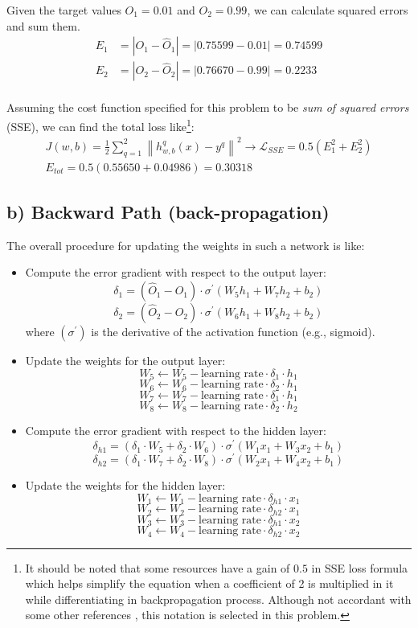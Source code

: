 \documentclass[conference]{IEEEtran}
\begin{document}
Given the target values \(
O_1 = 0.01
\) and \(
O_2 = 0.99
\), we can calculate squared errors and sum them.
\begin{align*}
    E_1 & = |O_1 - \hat{O}_1| = |0.75599 - 0.01| = 0.74599 \nonumber \\
    E_2 & = |O_2 - \hat{O}_2| = |0.76670 - 0.99| = 0.2233 \nonumber  \\
\end{align*}

Assuming the cost function specified for this problem to be \textit{sum of squared errors} (SSE), we can find the total loss like\footnote{It should be noted that some resources \cite{b6} have a gain of $0.5$ in SSE loss formula which helps simplify the equation when a coefficient of 2 is multiplied in it while differentiating in backpropagation process. Although not accordant with some other references \cite{b7}, this notation is selected in this problem.}:
\begin{gather}
    J(w, b) = \frac{1}{2} \sum_{q=1}^{2} \left\| h_{w, b}^q(x) - y^q \right\|^2 \rightarrow \mathcal{L}_{SSE} = 0.5 \left(E_1^2 + E_2^2\right) \nonumber \\
    E_{tot} = 0.5 (0.55650 + 0.04986) = \mathbf{0.30318}
\end{gather}

\subsection*{b) Backward Path (back-propagation)}
The overall procedure for updating the weights in such a network is like:
\begin{itemize}
    \item Compute the error gradient with respect to the output layer: \[ \delta_1 = (\hat{O}_1 - O_1) \cdot \sigma^\prime(W_5 h_1 + W_7 h_2 + b_2) \] \[ \delta_2 = (\hat{O}_2 - O_2) \cdot \sigma^\prime(W_6 h_1 + W_8 h_2 + b_2) \] where $(\sigma^\prime)$ is the derivative of the activation function (e.g., sigmoid).
    \item Update the weights for the output layer: \[ W_5 \leftarrow W_5 - \text{learning rate} \cdot \delta_1 \cdot h_1 \] \[ W_6 \leftarrow W_6 - \text{learning rate} \cdot \delta_2 \cdot h_1 \] \[ W_7 \leftarrow W_7 - \text{learning rate} \cdot \delta_1 \cdot h_1 \] \[ W_8 \leftarrow W_8 - \text{learning rate} \cdot \delta_2 \cdot h_2 \]
    \item Compute the error gradient with respect to the hidden layer: \[ \delta_{h1} = (\delta_1 \cdot W_5 + \delta_2 \cdot W_6) \cdot \sigma^\prime(W_1x_1 + W_3x_2 + b_1) \] \[ \delta_{h2} = (\delta_1 \cdot W_7 + \delta_2 \cdot W_8) \cdot \sigma^\prime(W_2x_1 + W_4x_2 + b_1) \]
    \item Update the weights for the hidden layer: \[ W_1 \leftarrow W_1 - \text{learning rate} \cdot \delta_{h1} \cdot x_1 \] \[ W_2 \leftarrow W_2 - \text{learning rate} \cdot \delta_{h2} \cdot x_1 \] \[ W_3 \leftarrow W_3 - \text{learning rate} \cdot \delta_{h1} \cdot x_2 \] \[ W_4 \leftarrow W_4 - \text{learning rate} \cdot \delta_{h2} \cdot x_2 \]
\end{itemize}
\end{document}
